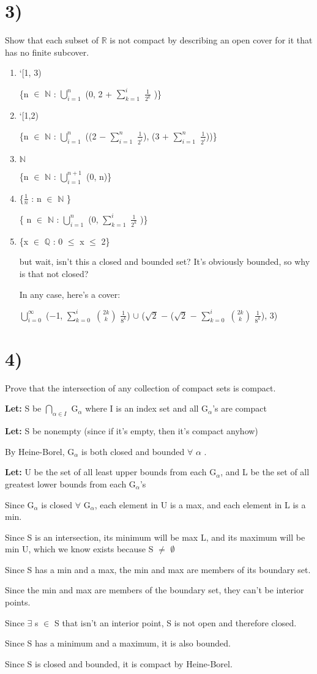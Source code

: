 \documentclass{article}
\newcommand{\mt}[1]{\ensuremath{#1}}
\newcommand\bsc[2][\DefaultOpt]{%
  \def\DefaultOpt{#2}%
  \section[#1]{#2}%
}
\newcommand{\balist}{\begin{enumerate}[label=\alph*.]}
\newcommand{\elist}{\end{enumerate}}
\newcommand{\lt}[1]{\textbf{Let: } #1}
\newcommand{\br}{\mt{\mathbb{R}} }       %
\newcommand{\bq}{\mt{\mathbb{Q}} }       %
\newcommand{\bn}{\mt{\mathbb{N}} }       %
\newcommand{\fa}{\mt{\forall} }          %
\newcommand{\afa}{\mt{\alpha} }
\newcommand{\mem}{\mt{\in} }
\newcommand{\exs}{\mt{\exists} }
\newcommand{\es}{\mt{\emptyset} }        %
\newcommand{\uw}[2]{#1\mt{_{#2}}}
\newcommand{\frc}[2]{\mt{\frac{#1}{#2}}}
\newcommand{\urng}[2]{\mt{\bigcup_{#1}^{#2}}}
\newcommand{\nrng}[2]{\mt{\bigcap_{#1}^{#2}}}
\newcommand{\nck}[2]{\mt{{#1 \choose #2}}}
\begin{document}
\bsc{3)}{
Show that each subset of \br is not compact by describing an open cover for it that has no finite subcover.

\balist
\item `[1, 3) 
	
	\{n \mem \bn : \urng{i = 1}{n} (0, 2 + $\sum_{k = 1}^i$ \frc{1}{2^k} )\}
\item `[1,2)
	
	\{n \mem \bn : \urng{i = 1}{n} ((2 $-$ $\sum_{i = 1}^n$ \frc{1}{2^i}), (3 $+$ $\sum_{i = 1}^n$ \frc{1}{2^i}))\}
\item \bn
	
	\{n \mem \bn: \urng{i = 1}{n + 1} (0, n)\}
\item \{\frc{1}{n} : n \mem \bn\}
	
	\{ n \mem \bn: \urng{i = 1}{n} (0, $\sum_{k = 1}^i$ \frc{1}{2^k} )\}
\item \{x \mem \bq : 0 $\leq$ x $\leq$ 2\} 
	
	but wait, isn't this a closed and bounded set? It's obviously bounded, so why is that not closed?
	
	In any case, here's a cover:
	
	\urng{i = 0}{\infty} ($-$1, $\sum_{k = 0}^i$ \nck{2k}{k} $\frac{1}{8^k}$) $\cup$ ($\sqrt{2}$ $-$ ($\sqrt{2}$ $-$ $\sum_{k = 0}^i$ \nck{2k}{k} $\frac{1}{8^k}$), 3)
	
\elist

}

\bsc{4)}{
Prove that the intersection of any collection of compact sets is compact.

\lt{S be \nrng{\afa \mem I}{} \uw{G}{\afa} where I is an index set and all \uw{G}{\afa}'s are compact}

\lt{S be nonempty (since if it's empty, then it's compact anyhow)}


By Heine-Borel, \uw{G}{\afa} is both closed and bounded \fa \afa.

\lt{U be the set of all least upper bounds from each \uw{G}{\afa}, and L be the set of all greatest lower bounds from each \uw{G}{\afa}'s}

Since \uw{G}{\afa} is closed \fa \uw{G}{\afa}, each element in U is a max, and each element in L is a min.

Since S is an intersection, its minimum will be max L, and its maximum will be min U, which we know exists because S $\neq$ \es

Since S has a min and a max, the min and max are members of its boundary set.

Since the min and max are members of the boundary set, they can't be interior points.

Since \exs s \mem S that isn't an interior point, S is not open and therefore closed.

Since S has a minimum and a maximum, it is also bounded.

Since S is closed and bounded, it is compact by Heine-Borel.
}
\end{document}
